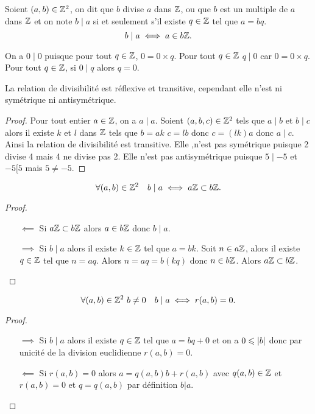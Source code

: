 \begin{defdef}
  Soient $(a,b) \in \mathbb{Z}^2$, on dit que $b$ divise $a$ dans $\mathbb{Z}$, ou que $b$ est un multiple de $a$ dans $\mathbb{Z}$ et on note $b\mid a$ si et seulement s'il existe $q \in \mathbb{Z}$ tel que $a=bq$.
  \begin{equation}
    b\mid a \iff a \in b\mathbb{Z}.
  \end{equation}
\end{defdef}
 On a $0\mid 0$ puisque pour tout $q \in \mathbb{Z}$, $0=0 \times q$. Pour tout $q \in \mathbb{Z}$ $q\mid 0$ car $0=0 \times q$. Pour tout $q \in \mathbb{Z}$, si $0\mid q$ alors $q=0$.

 \begin{prop}
   La relation de divisibilité est réflexive et transitive, cependant elle n'est ni symétrique ni antisymétrique.
 \end{prop}
 \begin{proof}
   Pour tout entier $a \in \mathbb{Z}$, on a $a\mid a$. Soient $(a,b,c) \in \mathbb{Z}^2$ tels que $a\mid b$ et $b\mid c$ alors il existe $k$ et $l$ dans $\mathbb{Z}$ tels que $b=ak$ $c=lb$ donc $c=(lk)a$ donc $a\mid c$. Ainsi la relation de divisibilité est transitive. Elle ,n'est pas symétrique puisque 2 divise 4 mais 4 ne divise pas 2. Elle n'est pas antisymétrique puisque $5\mid -5$ et $-5[5$ mais $5 \neq -5$.
 \end{proof}
 \begin{prop}
   \begin{equation}
     \forall (a,b) \in \mathbb{Z}^2 \quad b\mid a \iff a\mathbb{Z} \subset b\mathbb{Z}.
   \end{equation}
 \end{prop}
 \begin{proof}
   \begin{itemize}
   \item[$\impliedby$] Si $a\mathbb{Z} \subset b\mathbb{Z}$ alors $a \in b\mathbb{Z}$ donc $b\mid a$.
   \item[$\implies$] Si $b\mid a$ alors il existe $k \in \mathbb{Z}$ tel que $a=bk$. Soit $n \in a\mathbb{Z}$, alors il existe $q \in \mathbb{Z}$ tel que $n=aq$. Alors $n=aq=b(kq)$ donc $n \in b\mathbb{Z}$. Alors $a\mathbb{Z} \subset b\mathbb{Z}$.
   \end{itemize}
 \end{proof}
 \begin{prop}
   \begin{equation}
     \forall (a,b) \in \mathbb{Z}^2 \ b\neq 0 \quad b\mid a \iff r(a,b)=0.
   \end{equation}
 \end{prop}
 \begin{proof}
   \begin{itemize}
   \item[$\implies$] Si $b\mid a$ alors il existe $q \in \mathbb{Z}$ tel que $a=bq+0$ et on a $0\leqslant \left\lvert b\right\rvert$ donc par unicité de la division euclidienne $r(a,b)=0$.
   \item[$\impliedby$] Si $r(a,b)=0$ alors $a=q(a,b) b+r(a,b)$ avec $q(a,b) \in \mathbb{Z}$ et $r(a,b)=0$ et $q=q(a,b)$ par définition $b|a$.
   \end{itemize}
 \end{proof}

